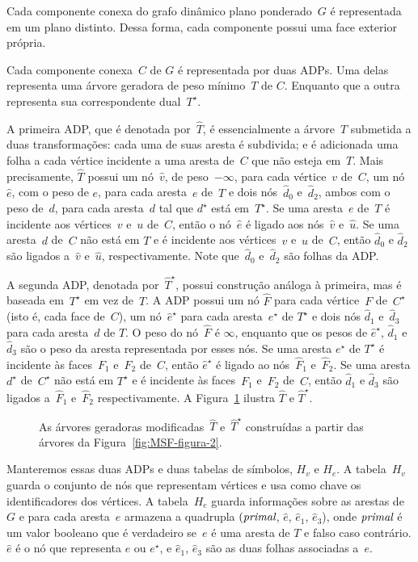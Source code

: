 Cada componente conexa do grafo dinâmico plano ponderado~$G$ é representada em um plano distinto.
Dessa forma, cada componente possui uma face exterior própria.

Cada componente conexa~$C$ de $G$ é representada por duas ADPs.
Uma delas representa uma árvore geradora de peso mínimo~$T$ de $C$.
Enquanto que a outra representa sua correspondente dual~$T^\star$.

A primeira ADP, que é denotada por~$\hat T$, é essencialmente a árvore~$T$ submetida a duas transformações: cada uma de suas aresta é subdivida; e é adicionada uma folha a cada vértice incidente a uma aresta de~$C$ que não esteja em~$T$.
Mais precisamente, $\hat T$ possui um nó~$\hat v$, de peso~$-\infty$, para cada vértice~$v$ de~$C$, um nó~$\hat e$, com o peso de $e$, para cada aresta~$e$ de~$T$ e dois nós~$\hat d_0$ e~$\hat d_2$, ambos com o peso de~$d$, para cada aresta~$d$ tal que $d^\star$ está em~$T^\star$.
Se uma aresta~$e$ de~$T$ é incidente aos vértices~$v$ e~$u$ de~$C$, então o nó~$\hat e$ é ligado aos nós~$\hat v$ e~$\hat u$.
Se uma aresta~$d$ de~$C$ não está em $T$ e é incidente aos vértices~$v$ e~$u$ de~$C$, então $\hat d_0$ e $\hat d_2$ são ligados a~$\hat v$ e~$\hat u$, respectivamente.
Note que~$\hat d_0$ e~$\hat d_2$ são folhas da ADP.

A segunda ADP, denotada por~$\hat T^\star$, possui construção análoga à primeira, mas é baseada em~$T^\star$ em vez de~$T$.
A ADP possui um nó $\hat F$ para cada vértice~$F$ de~$C^\star$ (isto é, cada face de~$C$), um nó~$\hat e^\star$ para cada aresta~$e^\star$ de $T^\star$ e dois nós $\hat d_1$ e~$\hat d_3$ para cada aresta~$d$ de $T$.
O peso do nó~$\hat F$ é $\infty$, enquanto que os pesos de $\hat e^\star$, $\hat d_1$ e~$\hat d_3$ são o peso da aresta representada por esses nós.
Se uma aresta $e^\star$ de $T^\star$ é incidente às faces~$F_1$ e~$F_2$ de~$C$, então $\hat e^\star$ é ligado ao nós~$\hat F_1$ e~$\hat F_2$.
Se uma aresta $d^\star$ de~$C^\star$ não está em $T^\star$ e é incidente às faces~$F_1$ e~$F_2$ de~$C$, então $\hat d_1$ e $\hat d_3$ são ligados a~$\hat F_1$ e~$\hat F_2$ respectivamente.
A Figura~\ref{fig:MSF-figura-3} ilustra $\hat T$ e $\hat T^\star$.

\begin{figure}[htb]
\centering

\caption{As árvores geradoras modificadas~$\hat T$ e~$\hat T^\star$ construídas a partir das árvores da Figura~\ref{fig:MSF-figura-2}.}
\label{fig:MSF-figura-3}
\end{figure}
Manteremos essas duas ADPs e duas tabelas de símbolos, $H_v$ e $H_e$. A tabela~$H_v$ guarda o conjunto de nós que representam vértices e usa como chave os identificadores dos vértices.
A tabela~$H_e$ guarda informações sobre as arestas de $G$ e para cada aresta~$e$ armazena a quadrupla $(\textit{primal}$, $\hat e$, $\hat e_1$, $\hat e_3$), onde $\textit{primal}$ é um valor booleano que é verdadeiro se~$e$ é uma aresta de $T$ e falso caso contrário. $\hat e$ é o nó que representa $e$ ou $e^\star$, e $\hat e_1$, $\hat e_3$ são as duas folhas associadas a~$e$. 

